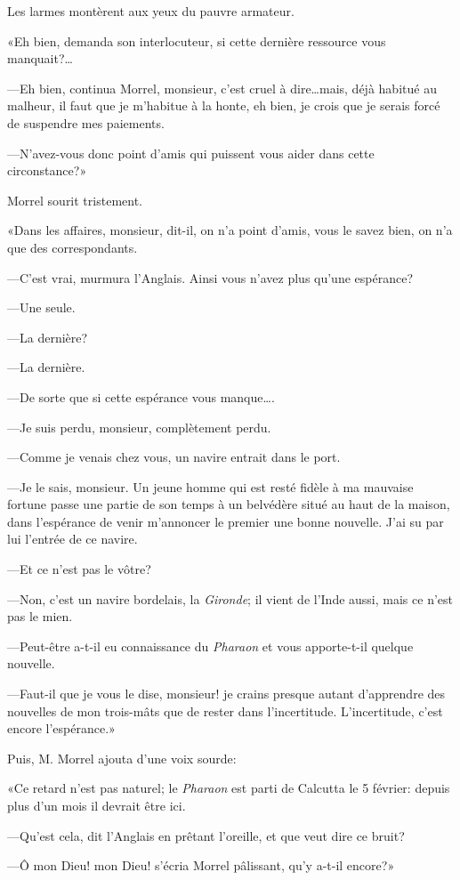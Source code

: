 Les larmes montèrent aux yeux du pauvre armateur.

«Eh bien, demanda son interlocuteur, si cette dernière ressource vous manquait?\dots

—Eh bien, continua Morrel, monsieur, c'est cruel à dire\dots mais, déjà habitué au malheur, il faut que je m'habitue à la honte, eh bien, je crois que je serais forcé de suspendre mes paiements.

—N'avez-vous donc point d'amis qui puissent vous aider dans cette circonstance?»

Morrel sourit tristement.

«Dans les affaires, monsieur, dit-il, on n'a point d'amis, vous le savez bien, on n'a que des correspondants.

—C'est vrai, murmura l'Anglais. Ainsi vous n'avez plus qu'une espérance?

—Une seule.

—La dernière?

—La dernière.

—De sorte que si cette espérance vous manque\dots.

—Je suis perdu, monsieur, complètement perdu.

—Comme je venais chez vous, un navire entrait dans le port.

—Je le sais, monsieur. Un jeune homme qui est resté fidèle à ma mauvaise fortune passe une partie de son temps à un belvédère situé au haut de la maison, dans l'espérance de venir m'annoncer le premier une bonne nouvelle. J'ai su par lui l'entrée de ce navire.

—Et ce n'est pas le vôtre?

—Non, c'est un navire bordelais, la \textit{Gironde}; il vient de l'Inde aussi, mais ce n'est pas le mien.

—Peut-être a-t-il eu connaissance du \textit{Pharaon} et vous apporte-t-il quelque nouvelle.

—Faut-il que je vous le dise, monsieur! je crains presque autant d'apprendre des nouvelles de mon trois-mâts que de rester dans l'incertitude. L'incertitude, c'est encore l'espérance.»

Puis, M. Morrel ajouta d'une voix sourde:

«Ce retard n'est pas naturel; le \textit{Pharaon} est parti de Calcutta le 5 février: depuis plus d'un mois il devrait être ici.

—Qu'est cela, dit l'Anglais en prêtant l'oreille, et que veut dire ce bruit?

—Ô mon Dieu! mon Dieu! s'écria Morrel pâlissant, qu'y a-t-il encore?»

